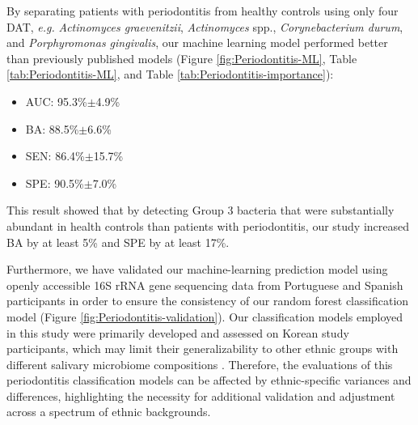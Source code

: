 \documentclass[11pt, a4paper, onecolumn, oneside]{report}
\begin{document}
            By separating patients with periodontitis from healthy controls using only four DAT, \textit{e.g.} \textit{Actinomyces graevenitzii}, \textit{Actinomyces} spp., \textit{Corynebacterium durum}, and \textit{Porphyromonas gingivalis}, our machine learning model performed better than previously published models (Figure \ref{fig:Periodontitis-ML}, Table \ref{tab:Periodontitis-ML}, and Table \ref{tab:Periodontitis-importance}):
            \begin{itemize}[noitemsep,nolistsep]
                \item AUC: 95.3\%$\pm$4.9\%
                \item BA: 88.5\%$\pm$6.6\%
                \item SEN: 86.4\%$\pm$15.7\%
                \item SPE: 90.5\%$\pm$7.0\%
            \end{itemize}

            This result showed that by detecting Group 3 bacteria that were substantially abundant in health controls than patients with periodontitis, our study increased BA by at least 5\% and SPE by at least 17\%.

            Furthermore, we have validated our machine-learning prediction model using openly accessible 16S rRNA gene sequencing data from Portuguese \cite{Periodontitis-10} and Spanish participants \cite{Periodontitis-Portuguese-1} in order to ensure the consistency of our random forest classification model (Figure \ref{fig:Periodontitis-validation}). Our classification models employed in this study were primarily developed and assessed on Korean study participants, which may limit their generalizability to other ethnic groups with different salivary microbiome compositions \cite{Periodontitis-ethnic-1, Periodontitis-ethnic-2}. Therefore, the evaluations of this periodontitis classification models can be affected by ethnic-specific variances and differences, highlighting the necessity for additional validation and adjustment across a spectrum of ethnic backgrounds.
\end{document}
